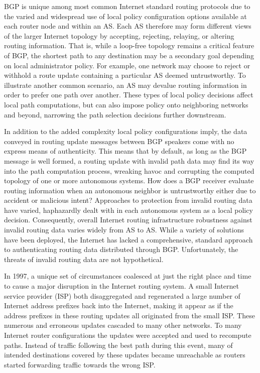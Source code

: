 \documentclass[sigconf]{acmart}
\begin{document}
BGP is unique among most common Internet standard routing protocols due
to the varied and widespread use of local policy configuration options
available at each router node and within an AS.  Each AS therefore may
form different views of the larger Internet topology by accepting,
rejecting, relaying, or altering routing information.  That is, while a
loop-free topology remains a critical feature of BGP, the shortest path
to any destination may be a secondary goal depending on local
administrator policy.  For example, one network may choose to reject or
withhold a route update containing a particular AS deemed untrustworthy.
To illustrate another common scenario, an AS may devalue routing
information in order to prefer one path over another.  These types of
local policy decisions affect local path computations, but can also
impose policy onto neighboring networks and beyond, narrowing the path
selection decisions further downstream.

In addition to the added complexity local policy configurations imply,
the data conveyed in routing update messages between BGP speakers come
with no express means of authenticity.  This means that by default, as
long as the BGP message is well formed, a routing update with invalid
path data may find its way into the path computation process, wreaking
havoc and corrupting the computed topology of one or more autonomous
systems.  How does a BGP receiver evaluate routing information when an
autonomous neighbor is untrustworthy either due to accident or malicious
intent?  Approaches to protection from invalid routing data have varied,
haphazardly dealt with in each autonomous system as a local policy
decision.  Consequently, overall Internet routing infrastructure
robustness against invalid routing data varies widely from AS to AS.
While a variety of solutions have been deployed, the Internet has lacked
a comprehensive, standard approach to authenticating routing data
distributed through BGP.  Unfortunately, the threats of invalid routing
data are not hypothetical.

In 1997, a unique set of circumstances coalesced at just the right place
and time to cause a major disruption in the Internet routing
system.\cite{barret_routing_1997}  A small Internet service provider
(ISP) both disaggregated and regenerated a large number of Internet
address prefixes back into the Internet, making it appear as if the
address prefixes in these routing updates all originated from the small
ISP.  These numerous and erroneous updates cascaded to many other
networks.  To many Internet router configurations the updates were
accepted and used to recompute paths.  Instead of traffic following the
best path during this event, many of intended destinations covered by
these updates became unreachable as routers started forwarding traffic
towards the wrong ISP.
\end{document}
